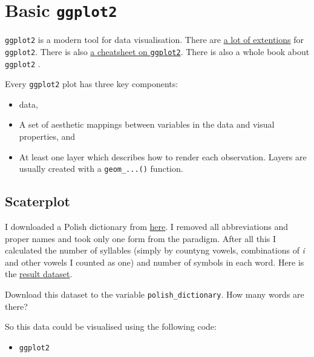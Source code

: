\documentclass[
]{book}
\makeatletter
\providecommand{\tightlist}{%
  \setlength{\itemsep}{0pt}\setlength{\parskip}{0pt}}
\newenvironment{kframe}{%
\medskip{}
\setlength{\fboxsep}{.8em}
 \def\at@end@of@kframe{}%
 \ifinner\ifhmode%
  \def\at@end@of@kframe{\end{minipage}}%
  \begin{minipage}{\columnwidth}%
 \fi\fi%
 \def\FrameCommand##1{\hskip\@totalleftmargin \hskip-\fboxsep
 \colorbox{shadecolor}{##1}\hskip-\fboxsep
     \hskip-\linewidth \hskip-\@totalleftmargin \hskip\columnwidth}%
 \MakeFramed {\advance\hsize-\width
   \@totalleftmargin\z@ \linewidth\hsize
   \@setminipage}}%
 {\par\unskip\endMakeFramed%
 \at@end@of@kframe}
\newenvironment{rmdblock}[1]
  {
  \begin{itemize}
  \renewcommand{\labelitemi}{
    \raisebox{-.7\height}[0pt][0pt]{
      {\setkeys{Gin}{width=3em,keepaspectratio}\texttt{[image: images/\#1]}}
    }
  }
  \setlength{\fboxsep}{1em}
  \begin{kframe}
  \item
  }
  {
  \end{kframe}
  \end{itemize}
  }
\newenvironment{rmdtask}
  {\begin{rmdblock}{task}}
  {\end{rmdblock}}
\makeatother
\begin{document}
\hypertarget{basic-ggplot2}{%
\section{\texorpdfstring{Basic \texttt{ggplot2}}{Basic ggplot2}}\label{basic-ggplot2}}

\texttt{ggplot2} is a modern tool for data visualisation. There are \href{http://www.ggplot2-exts.org/gallery/}{a lot of extentions} for \texttt{ggplot2}. There is also \href{https://github.com/rstudio/cheatsheets/raw/master/data-visualization-2.1.pdf}{a cheatsheet on \texttt{ggplot2}}. There is also a whole book about \texttt{ggplot2} \citep{wickham16}.

Every \texttt{ggplot2} plot has three key components:

\begin{itemize}
\tightlist
\item
  data,
\item
  A set of aesthetic mappings between variables in the data and visual properties, and
\item
  At least one layer which describes how to render each observation. Layers
  are usually created with a \texttt{geom\_...()} function.
\end{itemize}

\hypertarget{scaterplot}{%
\subsection{Scaterplot}\label{scaterplot}}

I downloaded a Polish dictionary from \href{https://sjp.pl/slownik/odmiany/}{here}. I removed all abbreviations and proper names and took only one form from the paradigm. After all this I calculated the number of syllables (simply by countyng vowels, combinations of \emph{i} and other vowels I counted as one) and number of symbols in each word. Here is the \href{https://raw.githubusercontent.com/agricolamz/2020.02_Naumburg_R/master/data/polish_dictionary.csv}{result dataset}.

\begin{rmdtask}
Download this dataset to the variable \texttt{polish\_dictionary}. How
many words are there?
\end{rmdtask}

So this data could be visualised using the following code:

\begin{itemize}
\tightlist
\item
  \texttt{ggplot2}
\end{itemize}
\end{document}
